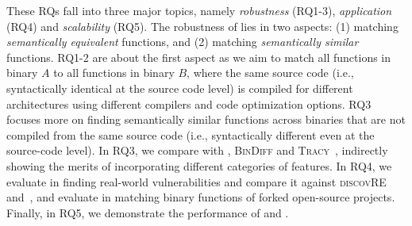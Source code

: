These RQs fall into three major topics, namely \emph{robustness} (RQ1-3), \emph{application} (RQ4) and \emph{scalability} (RQ5). The robustness of \toolNew lies in two aspects: (1) matching \emph{semantically equivalent} functions, and (2) matching \emph{semantically similar} functions. RQ1-2 are about the first aspect  as we aim to match all functions in binary $A$ to all functions in binary $B$, where the same source code (i.e., syntactically identical at the source code level) is compiled for different architectures using different compilers and code optimization options. RQ3 focuses more on finding semantically similar functions across binaries that are not compiled from the same source code (i.e., syntactically different even at the source-code level). 
In RQ3, we compare \toolNew with  \tool, \textsc{\small BinDiff} \cite{DBLP:conf/dimva/Flake04} and \textsc{Tracy}~\cite{DBLP:conf/pldi/DavidY14}, indirectly showing the merits of incorporating different categories of features. In RQ4, we evaluate \tool in finding real-world vulnerabilities and compare it against  \textsc{discovRE}~\cite{sebastian2016discovre} and~\cite{DBLP:conf/sp/PewnyGGRH15}, and evaluate \toolNew in matching binary functions of forked open-source projects. Finally, in RQ5, we demonstrate the performance of \tool and \toolNew.%



